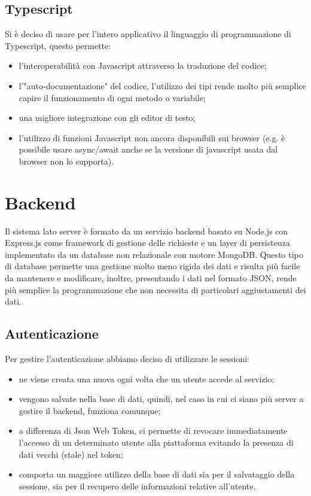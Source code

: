\documentclass[italian]{report}
\begin{document}
\subsection{Typescript}
Si è deciso di usare per l'intero applicativo il linguaggio di programmazione di Typescript, questo permette:
\begin{itemize}
    \item l'interoperabilità con Javascript attraverso la traduzione del codice;
    \item l'"auto-documentazione" del codice, l'utilizzo dei tipi rende molto più semplice capire il funzionamento di ogni metodo o variabile;
    \item una migliore integrazione con gli editor di testo;
    \item l'utilizzo di funzioni Javascript non ancora disponibili sui browser (e.g. è possibile usare async/await anche se la versione di javascript usata dal browser non lo supporta).
\end{itemize}

\section{Backend}
Il sistema lato server è formato da un servizio backend basato su Node.js con Express.js come framework di gestione delle richieste e un layer di persistenza implementato da un database non relazionale con motore MongoDB. Questo tipo di database permette una gestione molto meno rigida dei dati e risulta più facile da mantenere e modificare, inoltre, presentando i dati nel formato JSON, rende più semplice la programmazione che non necessita di particolari aggiustamenti dei dati.

\subsection{Autenticazione}
Per gestire l'autenticazione abbiamo deciso di utilizzare le sessioni:
\begin{itemize}
    \item ne viene creata una nuova ogni volta che un utente accede al servizio;
    \item vengono salvate nella base di dati, quindi, nel caso in cui ci siano più server a gestire il backend, funziona comunque;
    \item a differenza di Json Web Token, ci permette di revocare immediatamente l'accesso di un determinato utente alla piattaforma evitando la presenza di dati vecchi (stale) nel token;
    \item comporta un maggiore utilizzo della base di dati sia per il salvataggio della sessione, sia per il recupero delle informazioni relative all'utente.
\end{itemize}
\end{document}
